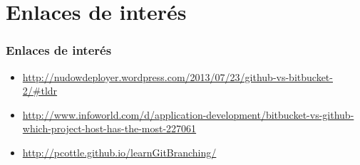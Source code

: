 \section{Enlaces de interés}
\frame
{
\frametitle{Enlaces de interés}
\begin{itemize}
\item \url{http://nudowdeployer.wordpress.com/2013/07/23/github-vs-bitbucket-2/\#tldr}
\item \url{http://www.infoworld.com/d/application-development/bitbucket-vs-github-which-project-host-has-the-most-227061}
\item \url{http://pcottle.github.io/learnGitBranching/}
\end{itemize}
}